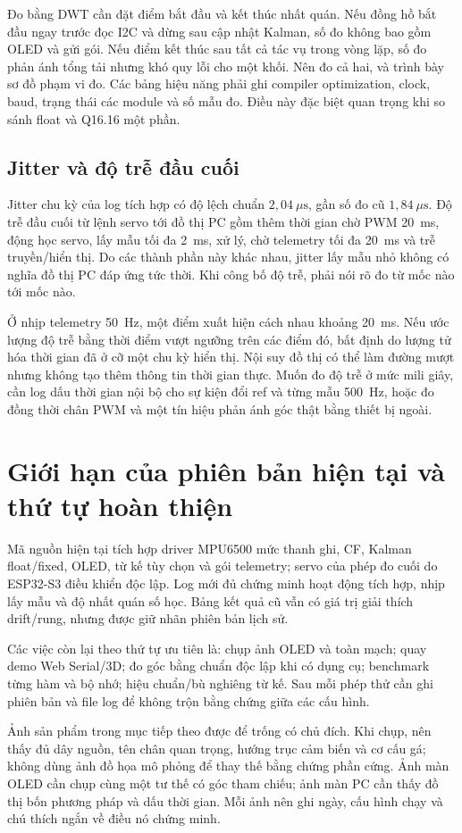 Đo bằng DWT cần đặt điểm bắt đầu và kết thúc nhất quán. Nếu đồng hồ bắt đầu ngay trước đọc I2C và dừng sau cập nhật Kalman, số đo không bao gồm OLED và gửi gói. Nếu điểm kết thúc sau tất cả tác vụ trong vòng lặp, số đo phản ánh tổng tải nhưng khó quy lỗi cho một khối. Nên đo cả hai, và trình bày sơ đồ phạm vi đo. Các bảng hiệu năng phải ghi compiler optimization, clock, baud, trạng thái các module và số mẫu đo. Điều này đặc biệt quan trọng khi so sánh float và Q16.16 một phần.

\subsection{Jitter và độ trễ đầu cuối}
Jitter chu kỳ của log tích hợp có độ lệch chuẩn $2{,}04~\mu\mathrm{s}$, gần số đo cũ $1{,}84~\mu\mathrm{s}$. Độ trễ đầu cuối từ lệnh servo tới đồ thị PC gồm thêm thời gian chờ PWM 20~ms, động học servo, lấy mẫu tối đa 2~ms, xử lý, chờ telemetry tối đa 20~ms và trễ truyền/hiển thị. Do các thành phần này khác nhau, jitter lấy mẫu nhỏ không có nghĩa đồ thị PC đáp ứng tức thời. Khi công bố độ trễ, phải nói rõ đo từ mốc nào tới mốc nào.

Ở nhịp telemetry 50~Hz, một điểm xuất hiện cách nhau khoảng 20~ms. Nếu ước lượng độ trễ bằng thời điểm vượt ngưỡng trên các điểm đó, bất định do lượng tử hóa thời gian đã ở cỡ một chu kỳ hiển thị. Nội suy đồ thị có thể làm đường mượt nhưng không tạo thêm thông tin thời gian thực. Muốn đo độ trễ ở mức mili giây, cần log dấu thời gian nội bộ cho sự kiện đổi ref và từng mẫu 500~Hz, hoặc đo đồng thời chân PWM và một tín hiệu phản ánh góc thật bằng thiết bị ngoài.

\section{Giới hạn của phiên bản hiện tại và thứ tự hoàn thiện}
Mã nguồn hiện tại tích hợp driver MPU6500 mức thanh ghi, CF, Kalman float/fixed, OLED, từ kế tùy chọn và gói telemetry; servo của phép đo cuối do ESP32-S3 điều khiển độc lập. Log mới đủ chứng minh hoạt động tích hợp, nhịp lấy mẫu và độ nhất quán số học. Bảng kết quả cũ vẫn có giá trị giải thích drift/rung, nhưng được giữ nhãn phiên bản lịch sử.

Các việc còn lại theo thứ tự ưu tiên là: chụp ảnh OLED và toàn mạch; quay demo Web Serial/3D; đo góc bằng chuẩn độc lập khi có dụng cụ; benchmark từng hàm và bộ nhớ; hiệu chuẩn/bù nghiêng từ kế. Sau mỗi phép thử cần ghi phiên bản và file log để không trộn bằng chứng giữa các cấu hình.

Ảnh sản phẩm trong mục tiếp theo được để trống có chủ đích. Khi chụp, nên thấy đủ dây nguồn, tên chân quan trọng, hướng trục cảm biến và cơ cấu gá; không dùng ảnh đồ họa mô phỏng để thay thế bằng chứng phần cứng. Ảnh màn OLED cần chụp cùng một tư thế có góc tham chiếu; ảnh màn PC cần thấy đồ thị bốn phương pháp và dấu thời gian. Mỗi ảnh nên ghi ngày, cấu hình chạy và chú thích ngắn về điều nó chứng minh.
